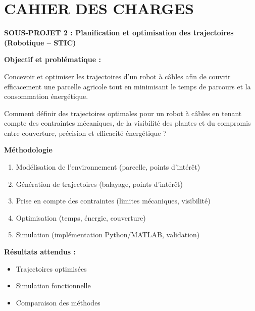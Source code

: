 \chapter*{CAHIER DES CHARGES}
\thispagestyle{plain}

\textbf{SOUS-PROJET 2 : Planification et optimisation des trajectoires}\\
\textbf{(Robotique -- STIC)}

\vspace{0.5cm}
\textbf{Objectif et problématique :}

Concevoir et optimiser les trajectoires d'un robot à câbles afin de couvrir efficacement une parcelle agricole tout en minimisant le temps de parcours et la consommation énergétique.

Comment définir des trajectoires optimales pour un robot à câbles en tenant compte des contraintes mécaniques, de la visibilité des plantes et du compromis entre couverture, précision et efficacité énergétique ?

\vspace{0.35cm}
\textbf{Méthodologie}

\begin{enumerate}[leftmargin=*,itemsep=2pt]
  \item Modélisation de l'environnement (parcelle, points d'intérêt)
  \item Génération de trajectoires (balayage, points d'intérêt)
  \item Prise en compte des contraintes (limites mécaniques, visibilité)
  \item Optimisation (temps, énergie, couverture)
  \item Simulation (implémentation Python/MATLAB, validation)
\end{enumerate}

\vspace{0.25cm}
\textbf{Résultats attendus :}
\begin{itemize}[leftmargin=*,itemsep=2pt]
  \item Trajectoires optimisées
  \item Simulation fonctionnelle
  \item Comparaison des méthodes
\end{itemize}
